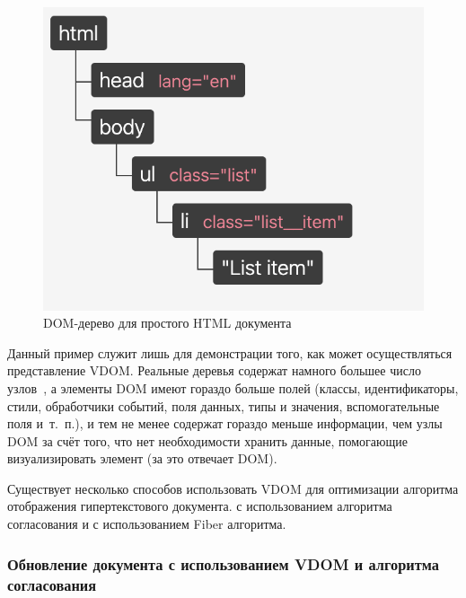 \begin{figure}[h]
	\centering
	\includegraphics[width=140mm]{img/dom-to-vdom-dom.png}
	\caption{DOM-дерево для простого HTML документа}
	\label{fig:dom-to-vdom-dom}
\end{figure}


Данный пример служит лишь для демонстрации того, как может осуществляться представление VDOM.
Реальные деревья содержат намного большее число узлов~\cite{dom-element}, а элементы DOM имеют гораздо больше полей (классы, идентификаторы, стили, обработчики событий, поля данных, типы и значения, вспомогательные поля и~т.~п.), и тем не менее содержат гораздо меньше информации, чем узлы DOM за счёт того, что нет необходимости хранить данные, помогающие визуализировать элемент (за это отвечает DOM).

Существует несколько способов использовать VDOM для оптимизации алгоритма отображения гипертекстового документа. с использованием алгоритма согласования и с использованием Fiber алгоритма.

\subsubsection{Обновление документа с использованием VDOM и алгоритма согласования}


